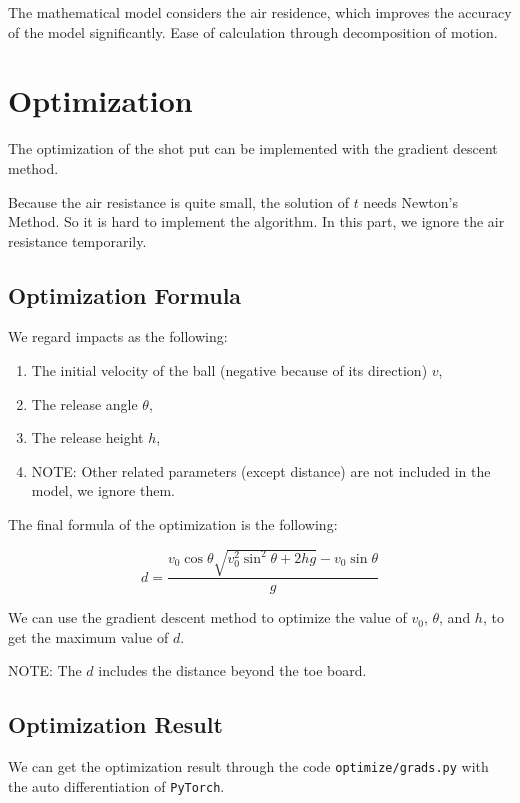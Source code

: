 \documentclass{article}
\begin{document}
The mathematical model considers the air residence, which improves the accuracy of the model significantly. Ease of calculation through decomposition of motion.

\section{Optimization}

The optimization of the shot put can be implemented with the gradient descent method.

Because the air resistance is quite small, the solution of $t$ needs Newton's Method. So it is hard to implement the algorithm. In this part, we ignore the air resistance temporarily.

\subsection{Optimization Formula}

We regard impacts as the following:

\begin{enumerate}
    \item The initial velocity of the ball (negative because of its direction) $v$,
    \item The release angle $\theta$,
    \item The release height $h$,
    \item NOTE: Other related parameters (except distance) are not included in the model, we ignore them.
\end{enumerate}

The final formula of the optimization is the following:

\begin{equation}
    d = \dfrac{v_0\cos\theta\sqrt{v_0^2\sin^2\theta+2hg}-v_0\sin\theta}{g}
\end{equation}

We can use the gradient descent method to optimize the value of $v_0$, $\theta$, and $h$, to get the maximum value of $d$.

NOTE: The $d$ includes the distance beyond the toe board.

\subsection{Optimization Result}
\label{subsection:optimization-result}

We can get the optimization result through the code \texttt{optimize/grads.py} with the auto differentiation of \texttt{PyTorch}.
\end{document}
